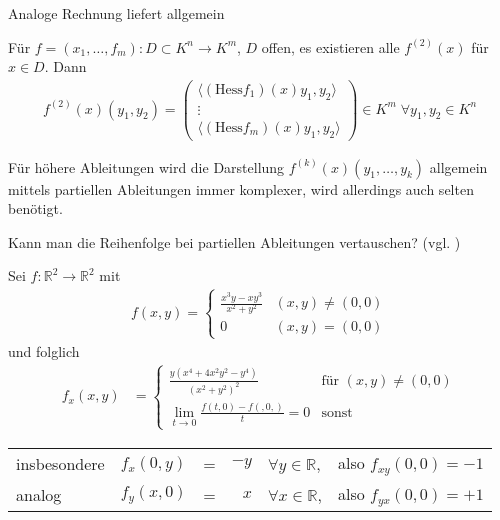 Analoge Rechnung liefert allgemein
\begin{conclusion}
	Für $f=(x_1, \dotsc, f_m):D\subset K^n\to K^m$, $D$ offen, es existieren alle $f^{(2)}(x)$ für $x\in D$. Dann \begin{align}
		f^{(2)}(x) (y_1,y_2) = \begin{pmatrix}
			\langle (\mathrm{Hess} f_1)(x) y_1, y_2\rangle \\ 
			\vdots\\
			\langle (\mathrm{Hess} f_m)(x) y_1,y_2\rangle
		\end{pmatrix} \in K^m\; \forall y_1, y_2\in K^n
	\end{align}
\end{conclusion}

\begin{remark}
	Für höhere Ableitungen wird die Darstellung $f^{(k)}(x)(y_1, \dotsc, y_k)$ allgemein mittels partiellen Ableitungen immer komplexer, wird allerdings auch selten benötigt.
\end{remark}

\begin{underlinedenvironment}[Frage]
	Kann man die Reihenfolge bei partiellen Ableitungen vertauschen? (vgl. )
\end{underlinedenvironment}

\begin{example}
	Sei $f:\mathbb{R}^2\to\mathbb{R}^2$ mit\begin{align*}
		f(x,y) = \begin{cases}
			\frac{x^3y - xy^3}{x^2+y^2} & (x,y)\neq(0,0)\\
			0 & (x,y)=(0,0)
		\end{cases}
	\end{align*}
	und folglich \begin{align*}
		f_x(x,y) &= \begin{cases}
			\frac{y(x^4 + 4x^2 y^2 - y^4)}{(x^2 + y^2)^2} & \text{für }(x,y) \neq (0,0) \\
			\lim\limits_{t\to 0}\frac{f(t,0) - f(,0,)}{t} = 0 & \text{sonst}
		\end{cases}
	\end{align*}
	\begin{tabularx}{\linewidth}{l@{\ }l@{\ }c@{\ }r@{\ }l@{\ }X}
		
	insbesondere & $f_x(0,y)$ &=& $-y$& $\forall y\in \mathbb{R}$,& also $f_{xy}(0,0) = -1$ \\
	analog & $f_y(x,0)$ &=& $x$ & $\forall x\in\mathbb{R}$,& also $f_{yx}(0,0) = +1$
	\end{tabularx}
\end{example}

